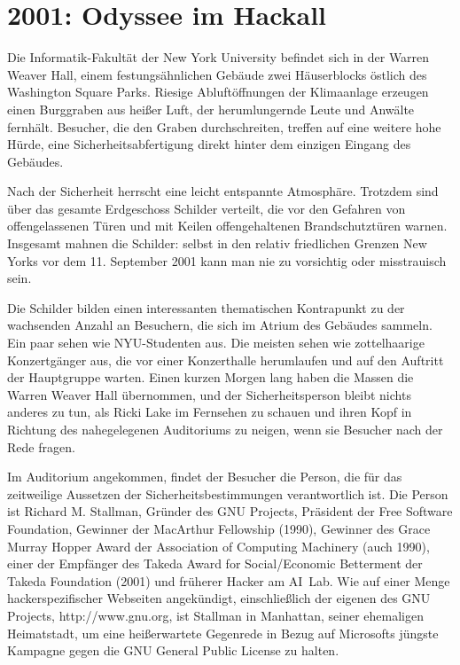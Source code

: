 \chapter{2001: Odyssee im Hackall}

Die Informatik-Fakultät der New York University befindet sich in der Warren Weaver Hall, einem festungsähnlichen Gebäude zwei Häuserblocks östlich des Washington Square Parks. Riesige Abluftöffnungen der Klimaanlage erzeugen einen Burggraben aus heißer Luft, der herumlungernde Leute und Anwälte fernhält. Besucher, die den Graben durchschreiten, treffen auf eine weitere hohe Hürde, eine Sicherheitsabfertigung direkt hinter dem einzigen Eingang des Gebäudes.

Nach der Sicherheit herrscht eine leicht entspannte Atmosphäre. Trotzdem sind über das gesamte Erdgeschoss Schilder verteilt, die vor den Gefahren von offengelassenen Türen und mit Keilen offengehaltenen Brandschutztüren warnen. Insgesamt mahnen die Schilder: selbst in den relativ friedlichen Grenzen New Yorks vor dem 11. September 2001 kann man nie zu vorsichtig oder misstrauisch sein.

Die Schilder bilden einen interessanten thematischen Kontrapunkt zu der wachsenden Anzahl an Besuchern, die sich im Atrium des Gebäudes sammeln. Ein paar sehen wie NYU-Studenten aus. Die meisten sehen wie zottelhaarige Konzertgänger aus, die vor einer Konzerthalle herumlaufen und auf den Auftritt der Hauptgruppe warten. Einen kurzen Morgen lang haben die Massen die Warren Weaver Hall übernommen, und der Sicherheitsperson bleibt nichts anderes zu tun, als Ricki Lake im Fernsehen zu schauen und ihren Kopf in Richtung des nahegelegenen Auditoriums zu neigen, wenn sie Besucher nach der Rede fragen.

Im Auditorium angekommen, findet der Besucher die Person, die für das zeitweilige Aussetzen der Sicherheitsbestimmungen verantwortlich ist. Die Person ist Richard M. Stallman, Gründer des GNU Projects, Präsident der Free Software Foundation, Gewinner der MacArthur Fellowship (1990), Gewinner des Grace Murray Hopper Award der Association of Computing Machinery (auch 1990), einer der Empfänger des Takeda Award for Social/Economic Betterment der Takeda Foundation (2001) und früherer Hacker am AI~Lab. Wie auf einer Menge hackerspezifischer Webseiten angekündigt, einschließlich der eigenen des GNU Projects, http://www.gnu.org, ist Stallman in Manhattan, seiner ehemaligen Heimatstadt, um eine heißerwartete Gegenrede in Bezug auf Microsofts jüngste Kampagne gegen die GNU General Public License zu halten.

